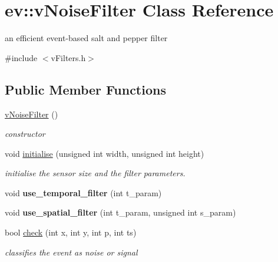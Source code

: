 \hypertarget{classev_1_1vNoiseFilter}{}\section{ev\+:\+:v\+Noise\+Filter Class Reference}
\label{classev_1_1vNoiseFilter}


an efficient event-\/based salt and pepper filter  




{\ttfamily \#include $<$v\+Filters.\+h$>$}

\subsection*{Public Member Functions}
\begin{DoxyCompactItemize}
\item 
\mbox{\label{classev_1_1vNoiseFilter_a762260be3ee9eb0923fe08f906da975f}} 
\hyperlink{classev_1_1vNoiseFilter_a762260be3ee9eb0923fe08f906da975f}{v\+Noise\+Filter} ()
\begin{DoxyCompactList}\small\item\em constructor \end{DoxyCompactList}\item 
\mbox{\label{classev_1_1vNoiseFilter_a9bdcff0c39c0c0d88c763050ba69cf19}} 
void \hyperlink{classev_1_1vNoiseFilter_a9bdcff0c39c0c0d88c763050ba69cf19}{initialise} (unsigned int width, unsigned int height)
\begin{DoxyCompactList}\small\item\em initialise the sensor size and the filter parameters. \end{DoxyCompactList}\item 
\mbox{\label{classev_1_1vNoiseFilter_a9038e484f9ad53c9cf9c59f4f76a567d}} 
void {\bfseries use\+\_\+temporal\+\_\+filter} (int t\+\_\+param)
\item 
\mbox{\label{classev_1_1vNoiseFilter_a667c37cc198f5410b071bab22117dd2e}} 
void {\bfseries use\+\_\+spatial\+\_\+filter} (int t\+\_\+param, unsigned int s\+\_\+param)
\item 
bool \hyperlink{classev_1_1vNoiseFilter_a8aa612fbfc163398c600853329768892}{check} (int x, int y, int p, int ts)
\begin{DoxyCompactList}\small\item\em classifies the event as noise or signal \end{DoxyCompactList}\end{DoxyCompactItemize}


